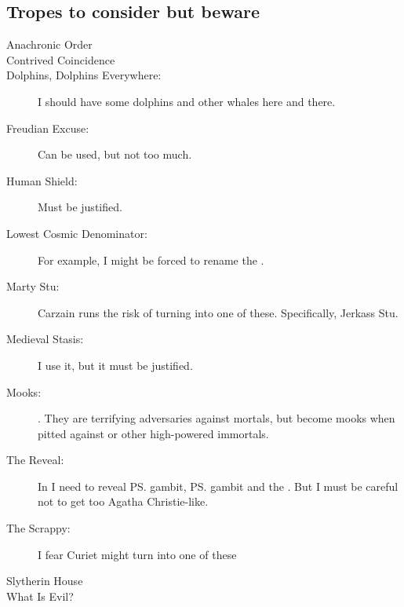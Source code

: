 \begin{flushleft}
\section{Tropes to consider but beware}
\begin{description}
  \item[Anachronic Order]
  \item[Contrived Coincidence] 
  \item[Dolphins, Dolphins Everywhere:] 
    I should have some dolphins and other whales here and there.
  \item[Freudian Excuse:] 
    Can be used, but not too much. 
  \item[Human Shield:] Must be justified. 
  \item[Lowest Cosmic Denominator:] 
    For example, I might be forced to rename the .
  \item[Marty Stu:] 
    Carzain runs the risk of turning into one of these. 
    \subitem Specifically, Jerkass Stu.
  \item[Medieval Stasis:] 
    I use it, but it must be justified. 
  \item[Mooks:] 
    \Banes. They are terrifying adversaries against mortals, but become mooks when pitted against \dragons{} or other high-powered immortals.
  \item[The Reveal:] 
    In \TwilightAngelRememberEmph I need to reveal \ps{\Secherdamon} gambit, \ps{\Ishnaruchaefir} gambit and the . 
    But I must be careful not to get too Agatha Christie-like.
  \item[The Scrappy:] I fear Curiet might turn into one of these\prikker
  \item[Slytherin House] 
  \item[What Is Evil?]
\end{description}




 
\end{flushleft}





